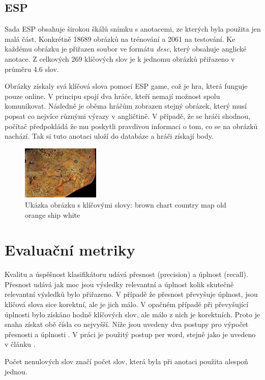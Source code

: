 \documentclass[czech,BP]{thesiskiv}
\begin{document}
\section{ESP}
\par Sada ESP obsahuje širokou škálů snímku s anotacemi, ze kterých byla použita jen malá část. Konkrétně \num{18 689} obrázků na trénování a \num{2061} na testování. Ke každému obrázku je přiřazen soubor ve formátu \textit{desc}, který obsahuje anglické anotace. Z celkových 269 klíčových slov je k jednomu obrázků přiřazeno v průměru 4.6 slov.

\par Obrázky získaly svá klíčová slova pomocí ESP game, což je hra, která funguje pouze online. V principu spojí dva hráče, kteří nemají možnost spolu komunikovat. Následně je oběma hráčům zobrazen stejný obrázek, který musí popsat co nejvíce různými výrazy v angličtině. V případě, že se hráči shodnou, počítač předpokládá že mu poskytli pravdivou informaci o tom, co se na obrázků nachází. Tak si tuto anotaci uloží do databáze a hráči získají body.

\begin{figure}[h]
		\centering
		\includegraphics[width=140px]{./img/esp.jpg}	
		\caption{Ukázka obrázku s klíčovými slovy: brown chart country map old orange ship white}
\end{figure}



\chapter{Evaluační metriky}
\par Kvalitu a úspěšnost klasifikátoru udává přesnost (precision) a úplnost (recall). Přesnost udává jak moc jsou výsledky relevantní a úplnost kolik skutečně relevantní výsledků bylo přiřazeno. V případě že přesnost převyšuje úplnost, jsou klíčová slova sice korektní, ale je jich málo. V opačném případě při převyšující úplnosti bylo získáno hodně klíčových slov, ale málo z nich je korektních. Proto je snaha získat obě čísla co nejvyšší. Níže jsou uvedeny dva postupy pro výpočet přesnosti a úplnosti \cite{Result_A_A}.  V práci je použitý postup per word, stejně jako je uvedeno v článku \citep{JEC}. 
\par Počet nenulových slov značí počet slov, která byla při anotaci použita alespoň jednou. 
\end{document}
